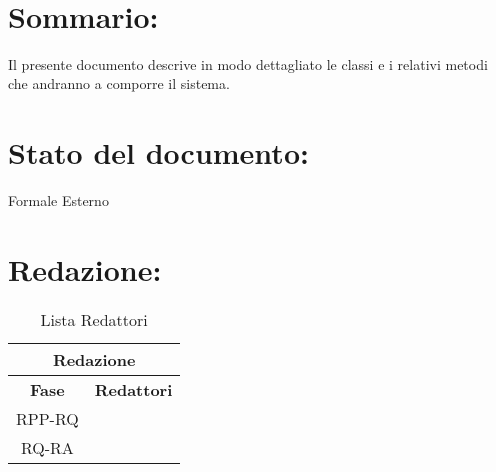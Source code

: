 \newpage

\begin{center} %
	\begin{Huge}	
				\textbf{\TITOLODOC}
			\\
	\end{Huge}
\end{center}

\section*{\LARGE Sommario:} %
Il presente documento descrive in modo dettagliato le classi e i relativi metodi che andranno a comporre il sistema.

\indent \indent

\section*{\LARGE Stato del documento:}
\indent \indent
	Formale Esterno

\section*{\LARGE Redazione:}
	\begin{table}[!h]
		\begin{center}
			\begin{tabular}
				{|c|c|}
				\hline
				\multicolumn{2}{|c|}{ \textbf{Redazione} } \\
				\hline
				\textbf{Fase} & \textbf{Redattori} \\
				\hline
				\multirow{2}{*}{RPP-RQ} & \\
										& \\
				\hline
				\multirow{1}{*}{RQ-RA} & \\
												
				\hline
			\end{tabular}
			\caption{Lista Redattori} %
			\label{tabredazione}
		\end{center}
	\end{table}
	
